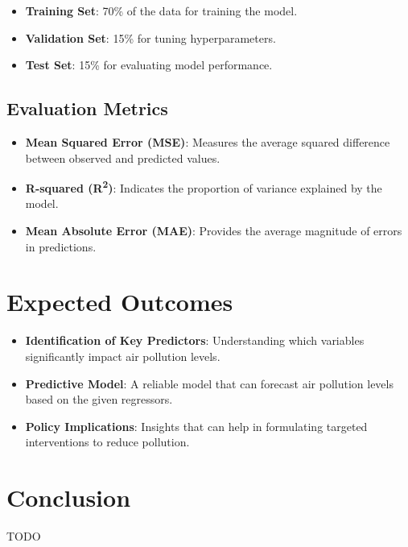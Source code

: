 \documentclass[12pt]{article}
\begin{document}
\begin{itemize}
    \item \textbf{Training Set}: 70\% of the data for training the model.
    \item \textbf{Validation Set}: 15\% for tuning hyperparameters.
    \item \textbf{Test Set}: 15\% for evaluating model performance.
\end{itemize}

\subsection{Evaluation Metrics}

\begin{itemize}
    \item \textbf{Mean Squared Error (MSE)}: Measures the average squared difference between observed and predicted values.
    \item \textbf{R-squared (R\textsuperscript{2})}: Indicates the proportion of variance explained by the model.
    \item \textbf{Mean Absolute Error (MAE)}: Provides the average magnitude of errors in predictions.
\end{itemize}




\section{Expected Outcomes}

\begin{itemize}
    \item \textbf{Identification of Key Predictors}: Understanding which variables significantly impact air pollution levels.
    \item \textbf{Predictive Model}: A reliable model that can forecast air pollution levels based on the given regressors.
    \item \textbf{Policy Implications}: Insights that can help in formulating targeted interventions to reduce pollution.
\end{itemize}




\section{Conclusion}

TODO

\printbibliography
\end{document}
